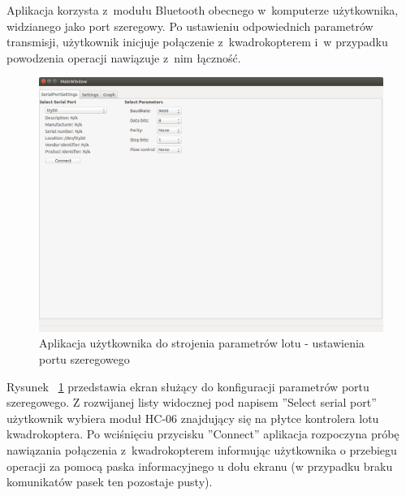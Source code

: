 \documentclass[11pt, twoside]{Thesis} %
\begin{document}
Aplikacja korzysta z~modułu Bluetooth obecnego w~komputerze użytkownika, widzianego jako port szeregowy. Po ustawieniu odpowiednich parametrów transmisji, użytkownik inicjuje połączenie z~kwadrokopterem i~w przypadku powodzenia operacji nawiązuje z~nim łączność. 

\begin{figure}[H]
	\centering
	\includegraphics[scale=0.4]{Pictures/QuadroTune/QuadroTuneSerialSettings.png}
	\caption[Aplikacja użytkownika do strojenia parametrów lotu - ustawienia portu szeregowego]{Aplikacja użytkownika do strojenia parametrów lotu - ustawienia portu szeregowego}
	\label{fig:QuadroTune_screen1}
\end{figure}

Rysunek ~\ref{fig:QuadroTune_screen1} przedstawia ekran służący do konfiguracji parametrów portu szeregowego. Z rozwijanej listy widocznej pod napisem ''Select serial port'' użytkownik wybiera moduł HC-06 znajdujący się na płytce kontrolera lotu kwadrokoptera. Po wciśnięciu przycisku ''Connect'' aplikacja rozpoczyna próbę nawiązania połączenia z~kwadrokopterem informując użytkownika o przebiegu operacji za pomocą paska informacyjnego u dołu ekranu (w przypadku braku komunikatów pasek ten pozostaje pusty).
\end{document}
